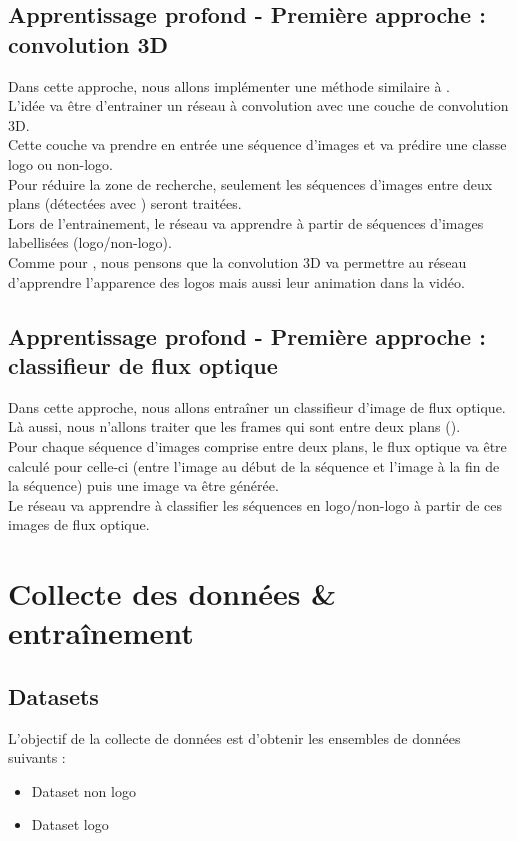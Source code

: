\documentclass[11pt]{article}
\begin{document}
\subsection{Apprentissage profond - Première approche : convolution 3D}
\label{sec:org91b4bb7}
Dans cette approche, nous allons implémenter une méthode similaire à \cite{Tran_2015}.\\
L'idée va être d'entrainer un réseau à convolution avec une couche de convolution 3D.\\
Cette couche va prendre en entrée une séquence d'images et va prédire une classe logo ou non-logo.\\
Pour réduire la zone de recherche, seulement les séquences d'images entre deux plans (détectées avec \cite{Abd_Almageed_2008}) seront traitées.\\
Lors de l'entrainement, le réseau va apprendre à partir de séquences d'images labellisées (logo/non-logo).\\
Comme pour \cite{Tran_2015}, nous pensons que la convolution 3D va permettre au réseau d'apprendre l'apparence des logos mais aussi leur animation dans la vidéo.\\
\subsection{Apprentissage profond - Première approche : classifieur de flux optique}
\label{sec:org33d6024}
Dans cette approche, nous allons entraîner un classifieur d'image de flux optique.\\
Là aussi, nous n'allons traiter que les frames qui sont entre deux plans (\cite{Abd_Almageed_2008}).\\
Pour chaque séquence d'images comprise entre deux plans, le flux optique va être calculé pour celle-ci (entre l'image au début de la séquence et l'image à la fin de la séquence) puis une image va être générée.\\
Le réseau va apprendre à classifier les séquences en logo/non-logo à partir de ces images de flux optique.\\
\newpage
\section{Collecte des données \& entraînement}
\label{sec:org1ba1e00}
\subsection{Datasets}
\label{sec:orga98fb23}
L'objectif de la collecte de données est d'obtenir les ensembles de données suivants :\\
\begin{itemize}
\item Dataset non logo\\
\item Dataset logo\\
\end{itemize}
\end{document}
